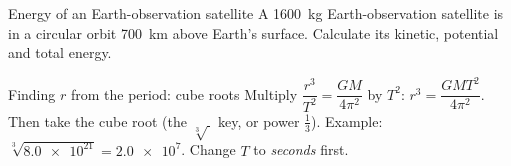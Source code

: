 \begin{workedexample}{Energy of an Earth-observation satellite}\label{ch5:we:observe}
A \qty{1600}{kg} Earth-observation satellite is in a circular orbit \qty{700}{km}
above Earth's surface. Calculate its kinetic, potential and total energy.
\end{workedexample}

\begin{toolkit}{Finding $r$ from the period: cube roots}
Multiply $\dfrac{r^3}{T^2} = \dfrac{GM}{4\pi^2}$ by $T^2$: $r^3 = \dfrac{GMT^2}{4\pi^2}$.
Then take the cube root (the $\sqrt[3]{\ }$ key, or power $\tfrac{1}{3}$). Example:
$\sqrt[3]{\num{8.0e21}} = \num{2.0e7}$. Change $T$ to \emph{seconds} first.
\end{toolkit}

